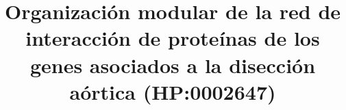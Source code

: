\documentclass{bmcart}
\begin{document}
	\begin{frontmatter}
	
		\begin{fmbox}
			
			
			\title{Organización modular de la red de interacción de proteínas de los genes asociados a la disección aórtica (HP:0002647)}
			
			
			\author[
			  addressref={aff1},                   %
			  corref={aff1},                       %
			  email={antoniosanchezdona9@uma.es}
			]{ } %
			\author[
			  addressref={aff1},
			  email={evalucialopezporras@uma.es}
			]{ }
			\author[
			  addressref={aff1},
			  email={aitananietoreus@uma.es}
			]{ }
			\author[
			  addressref={aff1},
			  email={nicosanchezalonso@uma.es}
			]{ }
			
			
			\address[id=aff1]{%
			  ,             %
			  ,          %
			  ,                              %
			}
		
		\end{fmbox}%
		
		\begin{abstractbox}
		
			\begin{abstract} %
			
			

\end{abstract}
\end{abstractbox}
\end{frontmatter}
\end{document}
